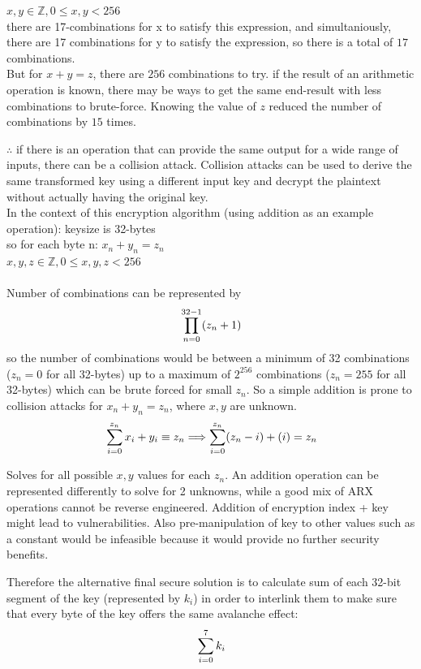 \documentclass[11pt]{article}
\theoremstyle{definition}
\theoremstyle{remark}
\begin{document}
$ x,y \in \mathbb{Z}, 0 \leq x,y < 256$ \\
there are 17-combinations for x to satisfy this expression, and simultaniously, there are 17 combinations for y to satisfy the expression, so there is a total of $17$ combinations.
\\
But for $x + y = z$, there are $256$ combinations to try. if the result of an arithmetic operation is known, there may be ways to get the same end-result with less combinations to brute-force. Knowing the value of $z$ reduced the number of combinations by $15$ times.

$\therefore$ if there is an operation that can provide the same output for a wide range of inputs, there can be a collision attack. Collision attacks can be used to derive the same transformed key using a different input key and decrypt the plaintext without actually having the original key.
\\
In the context of this encryption algorithm (using addition as an example operation): keysize is 32-bytes
\\
so for each byte n: $x_n + y_n = z_n$\\
$ x,y,z \in \mathbb{Z}, 0 \leq x,y,z < 256$\\
\\
Number of combinations can be represented by 
\[
\\		\prod_{n=0}^{32-1}(z_n+1)
\]
\small so the number of combinations would be between a minimum of 32 combinations ($z_n=0$ for all 32-bytes) up to a maximum of $2^{256}$ combinations ($z_n = 255$ for all 32-bytes) which can be brute forced for small $z_n$. So a simple addition is prone to collision attacks for $x_n+y_n=z_n$, where $x,y$ are unknown.
\[
\\\sum_{i=0}^{z_n} x_i + y_i \equiv z_n \Longrightarrow
\sum_{i=0}^{z_n} (z_n-i)+(i) = z_n
\]

Solves for all possible $x, y$ values for each $z_n$. An addition operation can be represented differently to solve for 2 unknowns, while a good mix of ARX operations cannot be reverse engineered. Addition of encryption index + key might lead to vulnerabilities. Also pre-manipulation of key to other values such as a constant would be infeasible because it would provide no further security benefits.

Therefore the alternative final secure solution is to calculate sum of each 32-bit segment of the key (represented by $k_i$) in order to interlink them to make sure that every byte of the key offers the same avalanche effect:
\[
\\\sum_{i=0}^{7} k_i
\]
\end{document}
